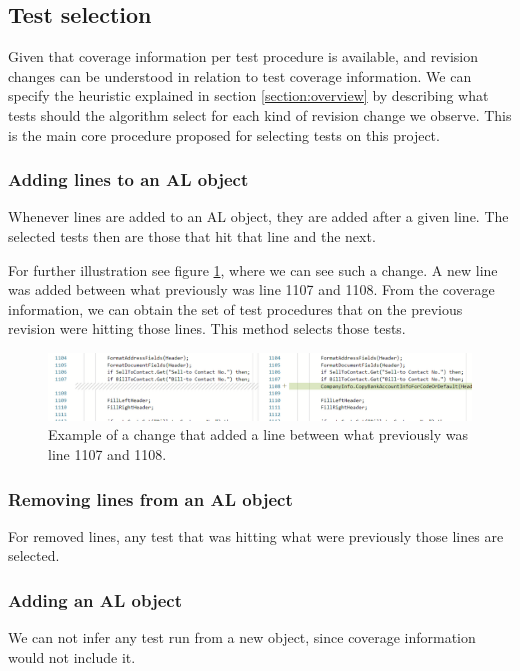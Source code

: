\documentclass{article}
\begin{document}
\subsection{Test selection}\label{section:test-selection}

Given that coverage information per test procedure is available, and revision changes can be understood in relation to test coverage information. We can specify the heuristic explained in section \ref{section:overview} by describing what tests should the algorithm select for each kind of revision change we observe. This is the main core procedure proposed for selecting tests on this project.

\subsubsection{Adding lines to an AL object}
Whenever lines are added to an AL object, they are added after a given line. The selected tests then are those that hit that line and the next.

For further illustration see figure \ref{fig:addinglinechange}, where we can see such a change. A new line was added between what previously was line 1107 and 1108. From the coverage information, we can obtain the set of test procedures that on the previous revision were hitting those lines. This method selects those tests.

\begin{figure}[H]
  \includegraphics[width=\textwidth]{images/addinglinechange.png}
  \caption{Example of a change that added a line between what previously was line 1107 and 1108.}
  \label{fig:addinglinechange}
\end{figure}

\subsubsection{Removing lines from an AL object}
For removed lines, any test that was hitting what were previously those lines are selected.
\subsubsection{Adding an AL object}
We can not infer any test run from a new object, since coverage information would not include it.
\end{document}
